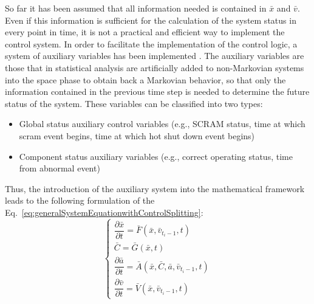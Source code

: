 \documentclass{mc2013}
\begin{document}
\label{sec:auxiliary}
So far it has been assumed that all information needed is contained in $\bar{x}$ and $\bar{v}$. Even if this information is sufficient for the calculation of the system status in every point in time, it is not a practical and efficient way to implement the control system.
In order to facilitate the implementation of the control logic, a system of auxiliary variables has been implemented .
The auxiliary variables are those that in statistical analysis are artificially added to non-Markovian systems into the space phase to obtain back a Markovian behavior, so that only the information contained in the previous time step is needed to determine the future status of the system.
These variables can be classified into two types: 
\begin{itemize}
\item Global status auxiliary control variables (e.g., SCRAM status, time at which scram event begins, time at which hot shut down event begins)
\item Component status auxiliary variables (e.g., correct operating status, time from abnormal event)
\end{itemize}
Thus, the introduction of the auxiliary system into the mathematical framework leads to the following formulation of the Eq.~\ref{eq:generalSystemEquationwithControlSplitting}:
\begin{equation}
\begin{cases} 
\dfrac{\partial \bar{x}}{\partial t} = \bar{F}(\bar{x},\bar{v}_{t_{i}-1},t) \\
\bar{C} = \bar{G}(\bar{x},t) \\ 
\dfrac{\partial \bar{a}}{\partial t} = \bar{A}(\bar{x},\bar{C},\bar{a},\bar{v}_{t_{i}-1},t) \\
\dfrac{\partial \bar{v}}{\partial t} = \bar{V}(\bar{x},\bar{v}_{t_{i}-1},t) 
\end{cases}
\label{eq:generalSystemEquationwithControlSplittingAndAux}
\end{equation}


\end{document}
